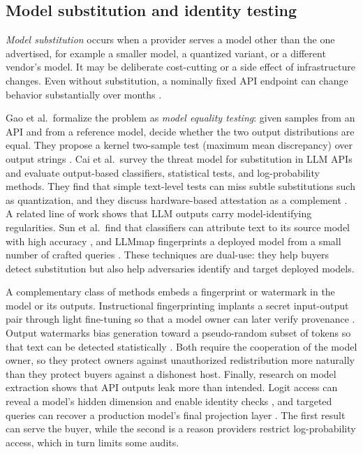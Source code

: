 \subsection{Model substitution and identity testing}\label{model-substitution-and-identity-testing}

\emph{Model substitution} occurs when a provider serves a model other than the one advertised, for example a smaller model, a quantized variant, or a different vendor's model. It may be deliberate cost-cutting or a side effect of infrastructure changes. Even without substitution, a nominally fixed API endpoint can change behavior substantially over months \cite{chen2024drift}.

Gao et al.~formalize the problem as \emph{model equality testing}: given samples from an API and from a reference model, decide whether the two output distributions are equal. They propose a kernel two-sample test (maximum mean discrepancy) over output strings \cite{gao2025equality}. Cai et al.~survey the threat model for substitution in LLM APIs and evaluate output-based classifiers, statistical tests, and log-probability methods. They find that simple text-level tests can miss subtle substitutions such as quantization, and they discuss hardware-based attestation as a complement \cite{cai2025substitution}. A related line of work shows that LLM outputs carry model-identifying regularities. Sun et al.~find that classifiers can attribute text to its source model with high accuracy \cite{sun2025idiosyncrasies}, and LLMmap fingerprints a deployed model from a small number of crafted queries \cite{pasquini2025llmmap}. These techniques are dual-use: they help buyers detect substitution but also help adversaries identify and target deployed models.

A complementary class of methods embeds a fingerprint or watermark in the model or its outputs. Instructional fingerprinting implants a secret input-output pair through light fine-tuning so that a model owner can later verify provenance \cite{xu2024instructional}. Output watermarks bias generation toward a pseudo-random subset of tokens so that text can be detected statistically \cite{kirchenbauer2023watermark}. Both require the cooperation of the model owner, so they protect owners against unauthorized redistribution more naturally than they protect buyers against a dishonest host. Finally, research on model extraction shows that API outputs leak more than intended. Logit access can reveal a model's hidden dimension and enable identity checks \cite{finlayson2024logits}, and targeted queries can recover a production model's final projection layer \cite{carlini2024stealing}. The first result can serve the buyer, while the second is a reason providers restrict log-probability access, which in turn limits some audits.

